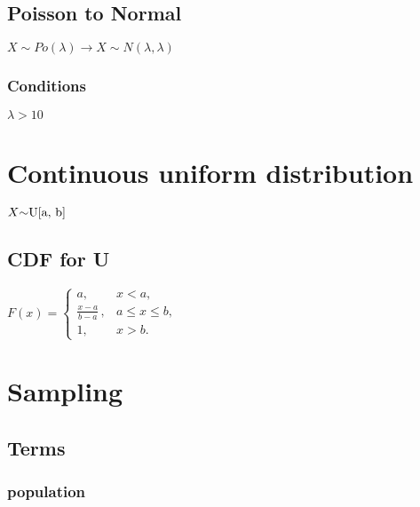 \documentclass[a4paper,9pt]{scrartcl}
\begin{document}
    \subsection{Poisson to Normal}

    \begin{math}
        X {\sim} Po(\lambda) \longrightarrow X {\sim} N(\lambda, \lambda)
    \end{math}

    \subsubsection{Conditions}

    \begin{math}
        \lambda > 10
    \end{math}


    \section{Continuous uniform distribution}

    \begin{math}
        X {\sim} $U[a, b]$
    \end{math}

    \subsection{CDF for U}

    \begin{math}
        F(x) = \left\{ \begin{matrix}
                           a, & x<a, \\
                           \frac{x-a}{b-a}\,, & a \leq x \leq b,\\
                           1, & x>b.
        \end{matrix}\right.
    \end{math}


    \section{Sampling}

    \subsection{Terms}

    \subsubsection{population}
\end{document}
